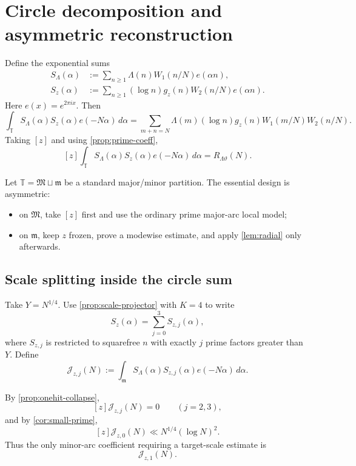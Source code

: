 \documentclass[11pt]{article}
\theoremstyle{definition}
\theoremstyle{remark}
\newcommand{\T}{\mathbb T}
\newcommand{\1}{\mathbf 1}
\newcommand{\Mcal}{\mathfrak M}
\newcommand{\mcal}{\mathfrak m}
\begin{document}
\section{Circle decomposition and asymmetric reconstruction}\label{sec:circle}

Define the exponential sums
\begin{align}
S_\Lambda(\alpha)
&:=\sum_{n\ge1}\Lambda(n)W_1(n/N)e(\alpha n),\label{eq:S-Lambda}\\
S_z(\alpha)
&:=\sum_{n\ge1}(\log n)g_z(n)W_2(n/N)e(\alpha n).\label{eq:S-z}
\end{align}
Here $e(x)=e^{2\pi i x}$.  Then
\begin{equation}\label{eq:circle-corr}
\int_\T S_\Lambda(\alpha)S_z(\alpha)e(-N\alpha)\,d\alpha
=
\sum_{m+n=N}\Lambda(m)(\log n)g_z(n)W_1(m/N)W_2(n/N).
\end{equation}
Taking $[z]$ and using \cref{prop:prime-coeff},
\begin{equation}\label{eq:circle-endpoint}
[z]\int_\T S_\Lambda(\alpha)S_z(\alpha)e(-N\alpha)\,d\alpha
=
R_{\Lambda\vartheta}(N).
\end{equation}

Let $\T=\Mcal\sqcup\mcal$ be a standard major/minor partition.  The essential design is asymmetric:
\begin{itemize}
\item on $\Mcal$, take $[z]$ first and use the ordinary prime major-arc local model;
\item on $\mcal$, keep $z$ frozen, prove a modewise estimate, and apply \cref{lem:radial} only afterwards.
\end{itemize}

\subsection{Scale splitting inside the circle sum}

Take $Y=N^{1/4}$.  Use \cref{prop:scale-projector} with $K=4$ to write
\begin{equation}\label{eq:Sz-sectors}
S_z(\alpha)=\sum_{j=0}^3 S_{z,j}(\alpha),
\end{equation}
where $S_{z,j}$ is restricted to squarefree $n$ with exactly $j$ prime factors greater than $Y$.  Define
\begin{equation}\label{eq:Jj}
\mathcal J_{z,j}(N)
:=
\int_{\mcal}S_\Lambda(\alpha)S_{z,j}(\alpha)e(-N\alpha)\,d\alpha.
\end{equation}

By \cref{prop:onehit-collapse},
\begin{equation}\label{eq:multi-hit-zero}
[z]\mathcal J_{z,j}(N)=0\qquad(j=2,3),
\end{equation}
and by \cref{cor:small-prime},
\begin{equation}\label{eq:zero-hit-small}
[z]\mathcal J_{z,0}(N)
\ll N^{1/4}(\log N)^2.
\end{equation}
Thus the only minor-arc coefficient requiring a target-scale estimate is
\begin{equation}\label{eq:onehit-J}
\mathcal J_{z,1}(N).
\end{equation}
\end{document}
